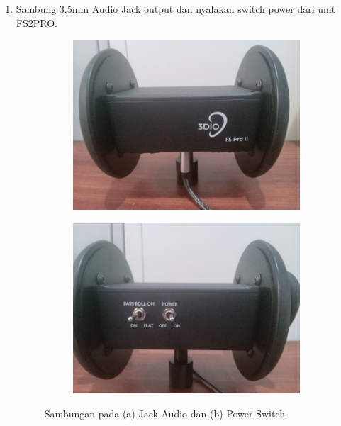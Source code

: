 \documentclass{article}
\begin{document}
	\begin{enumerate}
		\item Sambung 3.5mm Audio Jack output dan nyalakan switch power dari unit FS2PRO.

		\begin{figure}[H]
			\centering
			\begin{subfigure}[]{.45\textwidth}
				\includegraphics[width=\textwidth]{images/fspro/setup0}
				\caption{}
			\end{subfigure}
			\begin{subfigure}[]{.45\textwidth}
				\includegraphics[width=\textwidth]{images/fspro/setup1}
				\caption{}
			\end{subfigure}
			\caption{Sambungan pada (a) Jack Audio dan (b) Power Switch}
			\label{fig:Setup Unit FS2Pro}
		\end{figure}


\end{enumerate}
\end{document}
